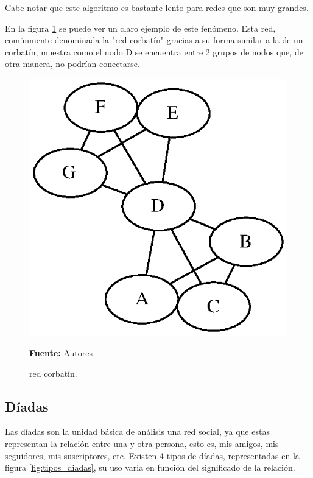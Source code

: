 Cabe notar que este algoritmo es bastante lento para redes que son muy grandes.

En la figura \ref{fig:bow_tie} se puede ver un claro ejemplo de este fenómeno. Esta red, comúnmente denominada la "red corbatín" gracias a su forma similar a la de un corbatín, muestra como el nodo D se encuentra entre 2 grupos de nodos que, de otra manera, no podrían conectarse.

\begin{figure}[!htb]
  \begin{center}
    \includegraphics{./imagenes/bow_tie.eps}
    \caption{red corbatín.}
    \label{fig:bow_tie}
    \textbf{Fuente:}  Autores
  \end{center}
\end{figure}

\subsection{Díadas}

Las díadas son la unidad básica de análisis una red social, ya que estas representan la relación entre una y otra persona, esto es, mis amigos, mis seguidores, mis suscriptores, etc. Existen 4 tipos de díadas, representadas en la figura \ref{fig:tipos_diadas}, su uso varia en función del significado de la relación.

